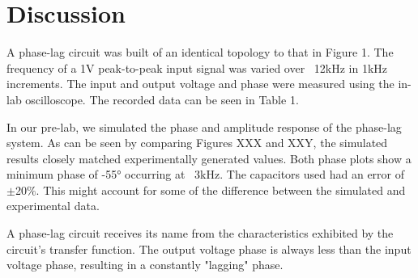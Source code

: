 \section{Discussion}\label{sec:discussion}
A phase-lag circuit was built of an identical topology to that in Figure 1.
The frequency of a 1V peak-to-peak input signal was varied over ~12kHz in 1kHz increments. 
The input and output voltage and phase were measured using the in-lab oscilloscope.
The recorded data can be seen in Table 1.

In our pre-lab, we simulated the phase and amplitude response of the phase-lag system.
As can be seen by comparing Figures XXX and XXY, the simulated results closely matched experimentally generated values.
Both phase plots show a minimum phase of -55\si{\degree} occurring at ~3kHz. 
The capacitors used had an error of $\pm$20$\%$.
This might account for some of the difference between the simulated and experimental data.

A phase-lag circuit receives its name from the characteristics exhibited by the circuit's transfer function. 
The output voltage phase is always less than the input voltage phase, resulting in a constantly "lagging" phase.